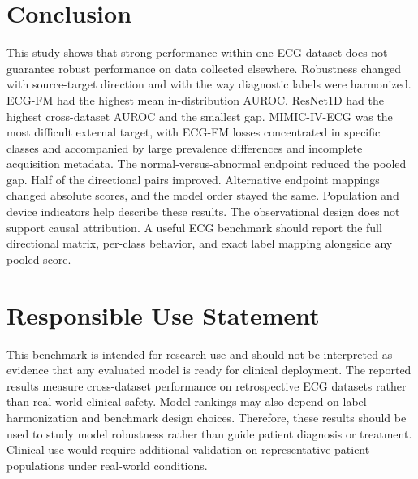 \documentclass[conference]{IEEEtran}
\begin{document}
\section{Conclusion}

This study shows that strong performance within one ECG dataset does not guarantee robust performance on data collected elsewhere. Robustness changed with source-target direction and with the way diagnostic labels were harmonized. ECG-FM had the highest mean in-distribution AUROC. ResNet1D had the highest cross-dataset AUROC and the smallest gap. MIMIC-IV-ECG was the most difficult external target, with ECG-FM losses concentrated in specific classes and accompanied by large prevalence differences and incomplete acquisition metadata. The normal-versus-abnormal endpoint reduced the pooled gap. Half of the directional pairs improved. Alternative endpoint mappings changed absolute scores, and the model order stayed the same. Population and device indicators help describe these results. The observational design does not support causal attribution. A useful ECG benchmark should report the full directional matrix, per-class behavior, and exact label mapping alongside any pooled score.

\section{Responsible Use Statement}

This benchmark is intended for research use and should not be interpreted as evidence that any evaluated model is ready for clinical deployment. The reported results measure cross-dataset performance on retrospective ECG datasets rather than real-world clinical safety. Model rankings may also depend on label harmonization and benchmark design choices. Therefore, these results should be used to study model robustness rather than guide patient diagnosis or treatment. Clinical use would require additional validation on representative patient populations under real-world conditions.
\end{document}

